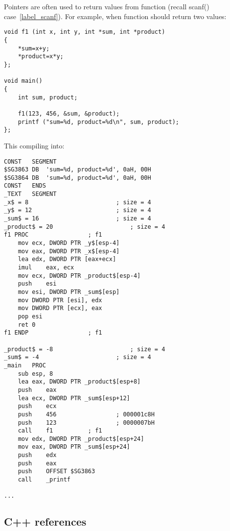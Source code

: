 \section{}
\index{\CLanguageElements!\Pointers}
\label{label_pointers}

{Pointers are often used to return values from function (recall scanf() case~\ref{label_scanf}).}
{For example, when function should return two values:}

\begin{lstlisting}
void f1 (int x, int y, int *sum, int *product)
{
	*sum=x+y;
	*product=x*y;
};

void main()
{
	int sum, product;

	f1(123, 456, &sum, &product);
	printf ("sum=%d, product=%d\n", sum, product);
};
\end{lstlisting}

{This compiling into:}

\begin{lstlisting}[caption=\Optimizing MSVC 2010]
CONST	SEGMENT
$SG3863	DB	'sum=%d, product=%d', 0aH, 00H
$SG3864	DB	'sum=%d, product=%d', 0aH, 00H
CONST	ENDS
_TEXT	SEGMENT
_x$ = 8							; size = 4
_y$ = 12						; size = 4
_sum$ = 16						; size = 4
_product$ = 20						; size = 4
f1 PROC					; f1
	mov	ecx, DWORD PTR _y$[esp-4]
	mov	eax, DWORD PTR _x$[esp-4]
	lea	edx, DWORD PTR [eax+ecx]
	imul	eax, ecx
	mov	ecx, DWORD PTR _product$[esp-4]
	push	esi
	mov	esi, DWORD PTR _sum$[esp]
	mov	DWORD PTR [esi], edx
	mov	DWORD PTR [ecx], eax
	pop	esi
	ret	0
f1 ENDP					; f1

_product$ = -8						; size = 4
_sum$ = -4						; size = 4
_main	PROC
	sub	esp, 8
	lea	eax, DWORD PTR _product$[esp+8]
	push	eax
	lea	ecx, DWORD PTR _sum$[esp+12]
	push	ecx
	push	456					; 000001c8H
	push	123					; 0000007bH
	call	f1			; f1
	mov	edx, DWORD PTR _product$[esp+24]
	mov	eax, DWORD PTR _sum$[esp+24]
	push	edx
	push	eax
	push	OFFSET $SG3863
	call	_printf

...
\end{lstlisting}

\subsection{C++ references}

